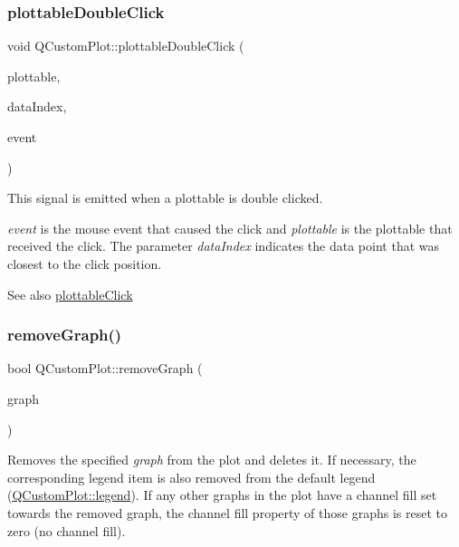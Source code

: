 \subsubsection{\texorpdfstring{plottable\+Double\+Click}{plottableDoubleClick}}
{\footnotesize\ttfamily void Q\+Custom\+Plot\+::plottable\+Double\+Click (\begin{DoxyParamCaption}\item[{\hyperlink{class_q_c_p_abstract_plottable}{Q\+C\+P\+Abstract\+Plottable} $\ast$}]{plottable,  }\item[{int}]{data\+Index,  }\item[{Q\+Mouse\+Event $\ast$}]{event }\end{DoxyParamCaption})\hspace{0.3cm}{\ttfamily [signal]}}

This signal is emitted when a plottable is double clicked.

{\itshape event} is the mouse event that caused the click and {\itshape plottable} is the plottable that received the click. The parameter {\itshape data\+Index} indicates the data point that was closest to the click position.

\begin{DoxySeeAlso}{See also}
\hyperlink{class_q_custom_plot_af5fe78b8bc9e4e96df921612837fd4fd}{plottable\+Click} 
\end{DoxySeeAlso}
\mbox{\label{class_q_custom_plot_a903561be895fb6528a770d66ac5e6713}} 
\subsubsection{\texorpdfstring{remove\+Graph()}{removeGraph()}\hspace{0.1cm}{\footnotesize\ttfamily [1/2]}}
{\footnotesize\ttfamily bool Q\+Custom\+Plot\+::remove\+Graph (\begin{DoxyParamCaption}\item[{\hyperlink{class_q_c_p_graph}{Q\+C\+P\+Graph} $\ast$}]{graph }\end{DoxyParamCaption})}

Removes the specified {\itshape graph} from the plot and deletes it. If necessary, the corresponding legend item is also removed from the default legend (\hyperlink{class_q_custom_plot_a4eadcd237dc6a09938b68b16877fa6af}{Q\+Custom\+Plot\+::legend}). If any other graphs in the plot have a channel fill set towards the removed graph, the channel fill property of those graphs is reset to zero (no channel fill).

